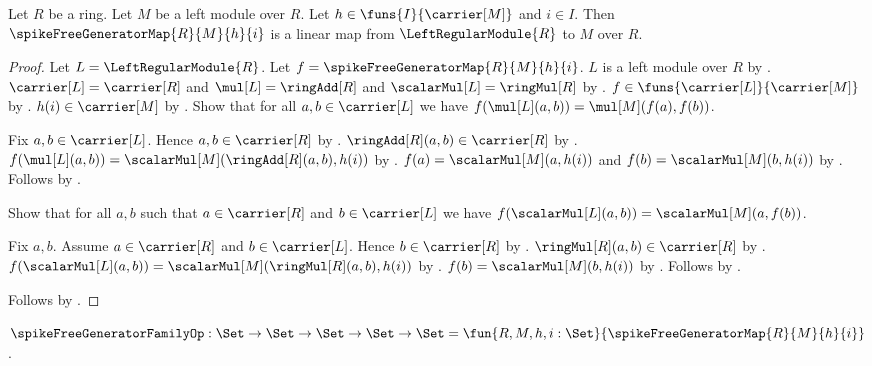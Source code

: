 \begin{theorem}\label{spike_free_generator_map_linear}
    Let $R$ be a ring.
    Let $M$ be a left module over $R$.
    Let $h\in\funs{I}{\carrier[M]}$ and $i\in I$.
    Then $\spikeFreeGeneratorMap{R}{M}{h}{i}$ is a linear map from
        $\LeftRegularModule{R}$ to $M$ over $R$.
\end{theorem}
\begin{proof}
    Let $L=\LeftRegularModule{R}$.
    Let $f=\spikeFreeGeneratorMap{R}{M}{h}{i}$.
    $L$ is a left module over $R$ by
        .
    $\carrier[L]=\carrier[R]$ and
        $\mul[L]=\ringAdd[R]$ and
        $\scalarMul[L]=\ringMul[R]$ by
        .
    $f\in\funs{\carrier[L]}{\carrier[M]}$ by
        .
    $h(i)\in\carrier[M]$ by .
    Show that for all $a,b\in\carrier[L]$ we have
        $f(\mul[L](a,b))=\mul[M](f(a),f(b))$.
    \begin{subproof}
        Fix $a,b\in\carrier[L]$.
        Hence $a,b\in\carrier[R]$ by \auto.
        $\ringAdd[R](a,b)\in\carrier[R]$ by .
        $f(\mul[L](a,b))
            =\scalarMul[M](\ringAdd[R](a,b),h(i))$ by
            .
        $f(a)=\scalarMul[M](a,h(i))$ and
            $f(b)=\scalarMul[M](b,h(i))$ by
            .
        Follows by .
    \end{subproof}
    Show that for all $a,b$ such that $a\in\carrier[R]$ and
        $b\in\carrier[L]$ we have
        $f(\scalarMul[L](a,b))=\scalarMul[M](a,f(b))$.
    \begin{subproof}
        Fix $a,b$.
        Assume $a\in\carrier[R]$ and $b\in\carrier[L]$.
        Hence $b\in\carrier[R]$ by \auto.
        $\ringMul[R](a,b)\in\carrier[R]$ by .
        $f(\scalarMul[L](a,b))
            =\scalarMul[M](\ringMul[R](a,b),h(i))$ by
            .
        $f(b)=\scalarMul[M](b,h(i))$ by
            .
        Follows by .
    \end{subproof}
    Follows by .
\end{proof}

\begin{definition}\label{spike_free_generator_family_op}
    $\spikeFreeGeneratorFamilyOp:
        \Set\to\Set\to\Set\to\Set\to\Set
        =\fun{R,M,h,i:\Set}{\spikeFreeGeneratorMap{R}{M}{h}{i}}$.
\end{definition}

